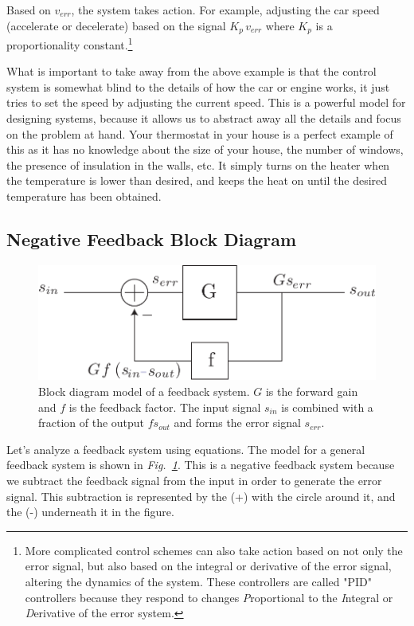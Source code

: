 Based on $v_{err}$, the system takes action.  For example, adjusting the car speed (accelerate or decelerate) based on the signal $K_p\,v_{err}$ where $K_p$ is a proportionality constant.\footnote{More complicated control schemes can also take action based on not only the error signal, but also based on the integral or derivative of the error signal, altering the dynamics of the system.  These controllers are called "PID" controllers because they respond to changes \emph{P}roportional to the \emph{I}ntegral or \emph{D}erivative of the error system.}

What is important to take away from the above example is that the control system is somewhat blind to the details of how the car or engine works, it just tries to set the speed by adjusting the current speed.  This is a powerful model for designing systems, because it allows us to abstract away all the details and focus on the problem at hand.  Your thermostat in your house is a perfect example of this as it has no knowledge about the size of your house, the number of windows, the presence of insulation in the walls, etc.  It simply turns on the heater when the temperature is lower than desired, and keeps the heat on until the desired temperature has been obtained.  
\subsection{Negative Feedback Block Diagram}
\begin{figure}[t]
\centering
\includegraphics[scale=0.75]{fbblock2}
\caption{Block diagram model of a feedback system.  $G$ is the forward gain and $f$ is the feedback factor.  The input signal $s_{in}$ is combined with a fraction of the output $f s_{out}$ and forms the error signal $s_{err}$.}
\label{fig:fbblock2}
\end{figure}
Let's analyze a feedback system using equations.  The model for a general feedback system is shown in \emph{Fig.~\ref{fig:fbblock2}}.  This is a negative feedback system because we subtract the feedback signal from the input in order to generate the error signal.  This subtraction is represented by the (+) with the circle around it, and the (-) underneath it in the figure.

